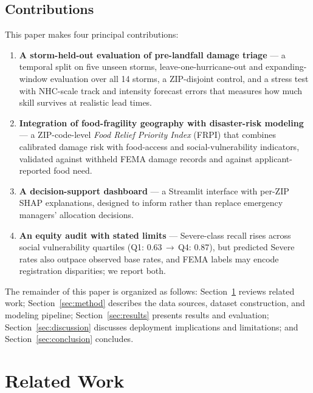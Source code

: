 \documentclass[conference]{IEEEtran}
\renewcommand{\_}{\origunderscore\allowbreak}
\begin{document}
\subsection{Contributions}
This paper makes four principal contributions:
\begin{enumerate}
    \item \textbf{A storm-held-out evaluation of pre-landfall
    damage triage} --- a temporal split on five unseen storms,
    leave-one-hurricane-out and expanding-window evaluation over
    all 14 storms, a ZIP-disjoint control, and a stress test with
    NHC-scale track and intensity forecast errors that measures
    how much skill survives at realistic lead times.
    \item \textbf{Integration of food-fragility geography with
    disaster-risk modeling} --- a ZIP-code-level \textit{Food Relief
    Priority Index} (FRPI) that combines calibrated damage risk
    with food-access and social-vulnerability indicators,
    validated against withheld FEMA damage records and against
    applicant-reported food need.
    \item \textbf{A decision-support dashboard} --- a Streamlit
    interface with per-ZIP SHAP explanations, designed to inform
    rather than replace emergency managers' allocation decisions.
    \item \textbf{An equity audit with stated limits} ---
    Severe-class recall rises across social vulnerability
    quartiles (Q1: 0.63\,$\rightarrow$\,Q4: 0.87), but predicted
    Severe rates also outpace observed base rates, and FEMA
    labels may encode registration disparities; we report both.
\end{enumerate}

The remainder of this paper is organized as follows:
Section~\ref{sec:related} reviews related work;
Section~\ref{sec:method} describes the data sources, dataset
construction, and modeling pipeline; Section~\ref{sec:results}
presents results and evaluation; Section~\ref{sec:discussion}
discusses deployment implications and limitations; and
Section~\ref{sec:conclusion} concludes.

\section{Related Work}
\label{sec:related}
\end{document}
